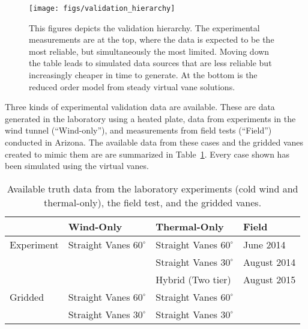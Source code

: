 %
%
 \begin{figure}[!htb]
   \begin{center}
    \texttt{[image: figs/validation\_hierarchy]}
    \caption{This figures depicts the validation hierarchy. The
    experimental measurements 
    are at the top, where the data is expected to be the most reliable,
    but simultaneously the most limited. Moving down the table leads to
    simulated data sources that are less reliable but increasingly
    cheaper in time to generate. At the bottom is the reduced order
    model from steady virtual vane solutions.} 
    \label{fig:val_hier}
   \end{center}
 \end{figure}

Three kinds of experimental validation data are available. These are
data generated in the laboratory using a heated plate, data from
experiments in the wind tunnel (``Wind-only''), and measurements from field
tests (``Field'') conducted in Arizona. The available data from
these cases and the gridded vanes created to mimic them are are
summarized in Table~\ref{tab:val_data}. Every case shown has been
simulated using the virtual vanes.   

\begin{table}[h]
\centering
\label{my-label}
\begin{tabular}{l|l|l|l|}
           & Wind-Only                   & Thermal-Only                & Field  \\
  \hline 
Experiment & Straight Vanes $60^{\circ}$ & Straight Vanes $60^{\circ}$ & June 2014   \\
           &                           & Straight Vanes $30^{\circ}$   & August 2014 \\
           &                           & Hybrid (Two tier)             & August 2015 \\
  \hline 
Gridded    & Straight Vanes $60^{\circ}$ & Straight Vanes $60^{\circ}$ & \\
           & Straight Vanes $30^{\circ}$ & Straight Vanes $30^{\circ}$ & \\
  \hline 
\end{tabular}
  \caption{Available truth data from the laboratory experiments 
    (cold wind and thermal-only), the field test, and the gridded vanes.} 
  \label{tab:val_data}
\end{table}
%
%
%
%
%

%
%
